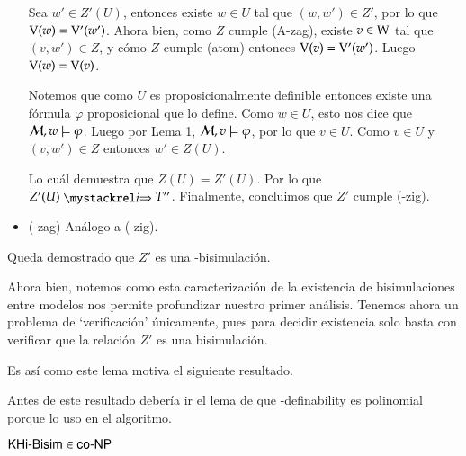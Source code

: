 \begin{demostracion}
\begin{itemize}
        Sea $w' \in Z'(U)$, entonces existe $w \in U$ tal que $(w,w') \in Z'$, por lo que $\mathrm{V}(w) = \mathrm{V}'(w')$. 
        Ahora bien, como $Z$ cumple (A-zag), existe $v \in \mathrm{W}$ tal que $(v,w') \in Z$, y cómo $Z$ cumple 
        (atom) entonces $\mathrm{V}(v) = \mathrm{V}'(w')$. Luego $\mathrm{V}(w) = \mathrm{V}(v)$.
    
        Notemos que como $U$ es proposicionalmente definible entonces existe una fórmula $\varphi$ 
        proposicional que lo define. Como $w \in U$, esto nos dice que $\mathcal{M}, w \models \varphi$. 
        Luego por Lema 1, $\mathcal{M}, v \models \varphi$, por lo que $v \in U$. Como $v \in U$ y $(v,w') \in Z$ 
        entonces $w' \in Z(U)$.
    
        Lo cuál demuestra que $Z(U) = Z'(U)$. Por lo que $Z'(U) \ultsExecAgi T''$. Finalmente, concluimos 
        que $Z'$ cumple (\KHilogic-zig).
    
    
        \item (\KHilogic-zag) Análogo a (\KHilogic-zig).
    \end{itemize}
    
    Queda demostrado que $Z'$ es una \KHilogic-bisimulación.
\end{demostracion}

Ahora bien, notemos como esta caracterización de la existencia de bisimulaciones entre modelos
nos permite profundizar nuestro primer análisis. Tenemos ahora un problema de `verificación'
únicamente, pues para decidir existencia solo basta con verificar que la relación $Z'$ es una bisimulación.

Es así como este lema motiva el siguiente resultado. 

Antes de este resultado debería ir el lema de que \KHilogic-definability es polinomial porque lo uso en el algoritmo. 


\begin{lema}
    $\rm\textsf{KHi-Bisim} \in \rm\textsf{co-NP}$ 
\end{lema}

